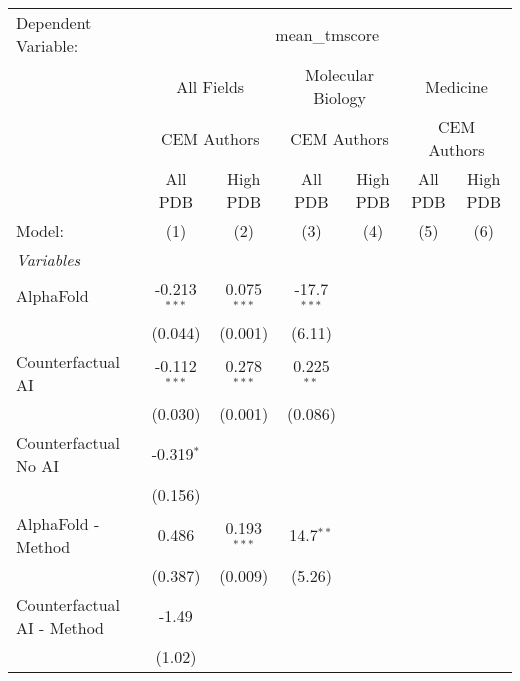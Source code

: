 \begingroup
\centering
\begin{tabular}{lcccccc}
   \tabularnewline \midrule \midrule
   Dependent Variable: & \multicolumn{6}{c}{mean\_tmscore}\\
 & \multicolumn{2}{c}{All Fields} & \multicolumn{2}{c}{Molecular Biology} & \multicolumn{2}{c}{Medicine} \\
\cmidrule(lr){2-3} \cmidrule(lr){4-5} \cmidrule(lr){6-7}
 & \multicolumn{2}{c}{CEM Authors} & \multicolumn{2}{c}{CEM Authors} & \multicolumn{2}{c}{CEM Authors} \\
\cmidrule(lr){2-3} \cmidrule(lr){4-5} \cmidrule(lr){6-7}
 & \multicolumn{1}{c}{All PDB} & \multicolumn{1}{c}{High PDB} & \multicolumn{1}{c}{All PDB} & \multicolumn{1}{c}{High PDB} & \multicolumn{1}{c}{All PDB} & \multicolumn{1}{c}{High PDB} \\
\cmidrule(lr){2-2} \cmidrule(lr){3-3} \cmidrule(lr){4-4} \cmidrule(lr){5-5} \cmidrule(lr){6-6} \cmidrule(lr){7-7}
   Model:                        & (1)            & (2)           & (3)           & (4) & (5) & (6)\\  
   \midrule
   \emph{Variables}\\
   AlphaFold                     & -0.213$^{***}$ & 0.075$^{***}$ & -17.7$^{***}$ &     &     &   \\   
                                 & (0.044)        & (0.001)       & (6.11)        &     &     &   \\   
   Counterfactual AI             & -0.112$^{***}$ & 0.278$^{***}$ & 0.225$^{**}$  &     &     &   \\   
                                 & (0.030)        & (0.001)       & (0.086)       &     &     &   \\   
   Counterfactual No AI          & -0.319$^{*}$   &               &               &     &     &   \\   
                                 & (0.156)        &               &               &     &     &   \\   
   AlphaFold - Method            & 0.486          & 0.193$^{***}$ & 14.7$^{**}$   &     &     &   \\   
                                 & (0.387)        & (0.009)       & (5.26)        &     &     &   \\   
   Counterfactual AI - Method    & -1.49          &               &               &     &     &   \\   
                                 & (1.02)         &               &               &     &     &   \\   

\end{tabular}
